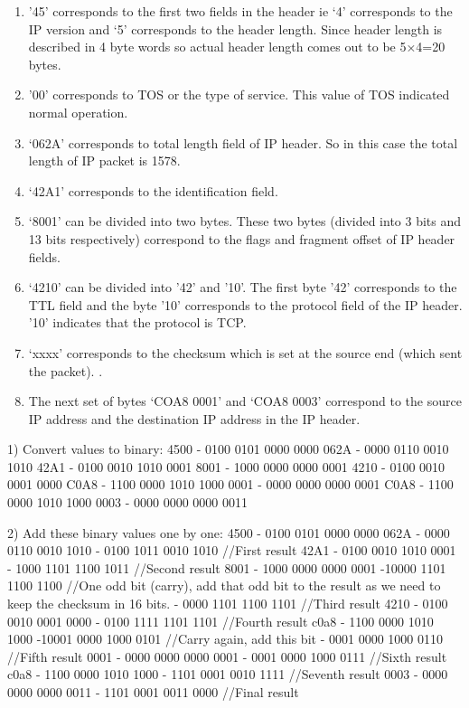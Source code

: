 \documentclass{WeSTassignment}
\begin{document}
\iffalse
\begin{enumerate}
\item ’45’ corresponds to the first two fields in the header ie  ‘4’ corresponds to the IP version and ‘5’ corresponds to the header length. Since header length is described in 4 byte words so actual header length comes out to be 5×4=20 bytes.
\item ’00’ corresponds to TOS or the type of service. This value of TOS indicated normal operation.
\item ‘062A’ corresponds to total length field of IP header. So in this case the total length of IP packet is 1578.
\item ‘42A1’ corresponds to the identification field.
\item ‘8001’ can be divided into two bytes. These two bytes (divided into 3 bits and 13 bits respectively) correspond to the flags and fragment offset of IP header fields.
\item ‘4210’ can be divided into ’42’ and ’10’. The first byte ’42’ corresponds to the TTL field and the byte ’10’ corresponds to the protocol field of the IP header. ’10’ indicates that the protocol is TCP.
\item ‘xxxx’ corresponds to the checksum which is set at the source end (which sent the packet). .
\item The next set of bytes ‘COA8 0001’ and ‘COA8 0003’ correspond to the source IP address and the destination IP address in the IP header.
\end{enumerate}

1) Convert values to binary:
4500 - 0100 0101 0000 0000
062A - 0000 0110 0010 1010
42A1 - 0100 0010 1010 0001
8001 - 1000 0000 0000 0001
4210 - 0100 0010 0001 0000
C0A8 - 1100 0000 1010 1000
0001 - 0000 0000 0000 0001
C0A8 - 1100 0000 1010 1000
0003 - 0000 0000 0000 0011

2) Add these binary values one by one:
4500 - 0100 0101 0000 0000
062A - 0000 0110 0010 1010
     - 0100 1011 0010 1010 //First result
42A1 - 0100 0010 1010 0001
     - 1000 1101 1100 1011 //Second result
8001 - 1000 0000 0000 0001
     -10000 1101 1100 1100 //One odd bit (carry),  add that odd bit to the result as we need to keep the checksum in 16 bits.
     - 0000 1101 1100 1101 //Third result
4210 - 0100 0010 0001 0000
     - 0100 1111 1101 1101 //Fourth result
c0a8 - 1100 0000 1010 1000
     -10001 0000 1000 0101 //Carry again, add this bit
     - 0001 0000 1000 0110 //Fifth result
0001 - 0000 0000 0000 0001
     - 0001 0000 1000 0111 //Sixth result
c0a8 - 1100 0000 1010 1000
     - 1101 0001 0010 1111 //Seventh result
0003 - 0000 0000 0000 0011
     - 1101 0001 0011 0000 //Final result   
     
\end{document}
